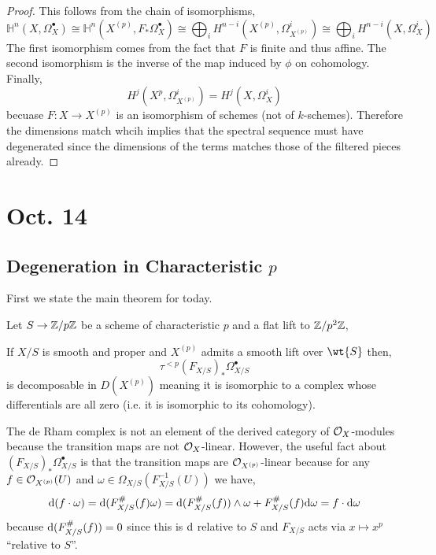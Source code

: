 \documentclass[12pt]{article}
\begin{document}
\begin{proof}
This follows from the chain of isomorphisms,
\[ \mathbb{H}^n(X, \Omega^\bullet_X) \cong \mathbb{H}^n(X^{(p)}, F_* \Omega^\bullet_X) \cong \bigoplus_{i} H^{n-i}(X^{(p)}, \Omega^i_{X^{(p)}}) \cong \bigoplus_{i} H^{n-i}(X, \Omega^i_X) \]
The first isomorphism comes from the fact that $F$ is finite and thus affine. The second isomorphism is the inverse of the map induced by $\phi$ on cohomology. Finally,
\[ H^{j}(X^{p}, \Omega^i_{X^{(p)}}) = H^{j}(X, \Omega^i_X) \]
becuase $F : X \to X^{(p)}$ is an isomorphism of schemes (not of $k$-schemes). 
Therefore the dimensions match whcih implies that the spectral sequence must have degenerated since the dimensions of the terms matches those of the filtered pieces already.
\end{proof}

\section{Oct. 14}

\subsection{Degeneration in Characteristic $p$}

First we state the main theorem for today.

\begin{thm}
Let $S \to \mathbb{Z} / p \mathbb{Z}$ be a scheme of characteristic $p$ and a flat lift to $\mathbb{Z} / p^2 \mathbb{Z}$,
\begin{center}
\end{center}
If $X/S$ is smooth and proper and $X^{(p)}$ admits a smooth lift over $\wt{S}$ then,
\[ \tau^{< p} (F_{X/S})_* \Omega^\bullet_{X/S} \]
is decomposable in $D(X^{(p)})$ meaning it is isomorphic to a complex whose differentials are all zero (i.e. it is isomorphic to its cohomology).
\end{thm}

\begin{rmk}
The de Rham complex is not an element of the derived category of $\mathcal{O}_{X}$-modules because the transition maps are not $\mathcal{O}_{X}$-linear. However, the useful fact about $(F_{X/S})_* \Omega_{X/S}^\bullet$ is that the transition maps are $\mathcal{O}_{X^{(p)}}$-linear because for any $f \in \mathcal{O}_{X^{(p)}}(U)$ and $\omega \in \Omega_{X/S}(F_{X/S}^{-1}(U))$ we have,
\[ \mathrm{d}{(f \cdot \omega)} = \mathrm{d}{(F_{X/S}^\#(f) \omega)} = \mathrm{d}{(F_{X/S}^\#(f))} \wedge \omega + F_{X/S}^\#(f) \mathrm{d}{\omega} = f \cdot \mathrm{d}{\omega} \]
because $\mathrm{d}{(F_{X/S}^\#(f))} = 0$ since this is $\mathrm{d}$ relative to $S$ and $F_{X/S}$ acts via $x \mapsto x^p$ ``relative to $S$''.
\end{rmk}
\end{document}
